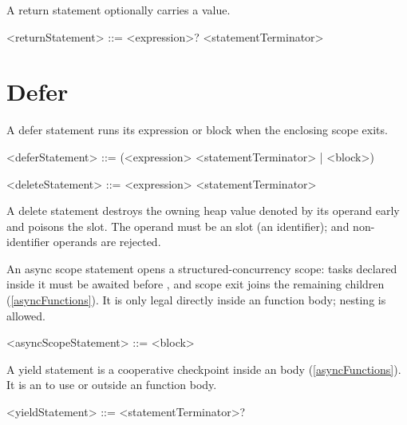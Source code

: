 \documentclass[makeidx]{article}
\begin{document}
\LMHash{}%
A return statement optionally carries a value.

\begin{grammar}
<returnStatement> ::= \RETURN{} <expression>? <statementTerminator>
\end{grammar}

\section{Defer}

\LMHash{}%
A defer statement runs its expression or block when the enclosing
scope exits.

\begin{grammar}
<deferStatement> ::= \DEFER{} (<expression> <statementTerminator> | <block>)

<deleteStatement> ::= \DELETE{} <expression> <statementTerminator>
\end{grammar}

\LMHash{}%
A delete statement destroys the owning heap value denoted by its operand
early and poisons the slot. The operand must be an  slot
(an identifier);  and non-identifier operands are
rejected.

\LMHash{}%
An async scope statement opens a structured-concurrency scope: tasks
declared inside it must be awaited before , and scope exit
joins the remaining children (\ref{asyncFunctions}). It is only legal
directly inside an  function body; nesting is allowed.

\begin{grammar}
<asyncScopeStatement> ::= \SCOPE{} <block>
\end{grammar}

\LMHash{}%
A yield statement is a cooperative checkpoint inside an 
body (\ref{asyncFunctions}). It is an  to use
 or  outside an  function body.


\begin{grammar}
<yieldStatement> ::= \YIELD{} <statementTerminator>?
\end{grammar}
\end{document}
